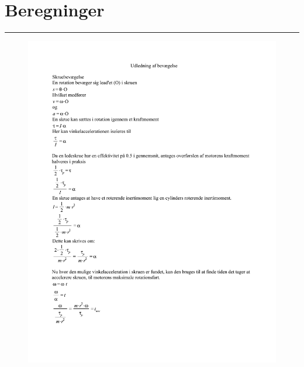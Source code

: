 \chapter{Beregninger} \label{Bilag - Bevægelse}


\plainbreak{-3}
\begin{figure}[H]
    \centering
    \includegraphics[width=0.98\linewidth]{bilag/Media/Media/Udledning.pdf}
\end{figure}

